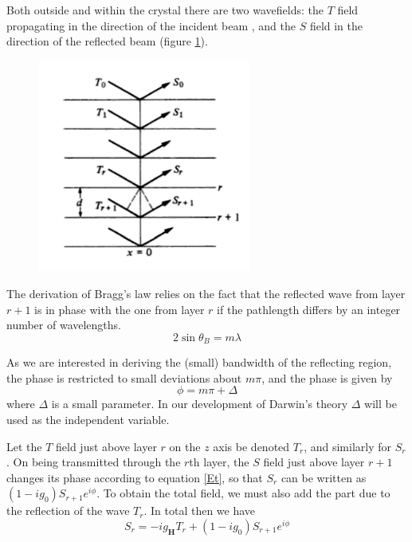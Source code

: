 \documentclass[12pt,oneside,notitlepage,abstracton,a4paper]{scrartcl}
\begin{document}
Both outside and within the crystal there are two wavefields: the $T$ field propagating in the direction of the incident beam , and the $S$ field in the direction of the reflected beam (figure \ref{pic3}).

\begin{figure}[h]
\begin{center}
\includegraphics[width=7cm]{pics/picture3.png}
\caption{}
\label{pic3}
\end{center}
\end{figure}


The derivation of Bragg's law relies on the fact that the reflected wave from layer $r+1$ is in phase with the one from layer $r$ if the pathlength differs by an integer number of wavelengths. 
\begin{equation}\label{bragg}
 2\sin{\theta_B}=m\lambda
\end{equation}

As we are interested in deriving the (small) bandwidth of the reflecting region, the phase is restricted to small deviations about $m\pi$, and the phase is given by
\begin{equation}\label{phase}
 \phi=m\pi+\Delta
\end{equation}
where $\Delta$ is a small parameter. In our development of Darwin's theory $\Delta$ will be used as the independent variable.

Let the $T$ field just above layer $r$ on the $z$ axis be denoted $T_r$, and similarly for $S_r$. On being transmitted through the $r$th layer, the $S$ field just above layer $r+1$ changes its phase according to equation \ref{Et}, so that $S_r$ can be written as $(1-ig_0)S_{r+1}e^{i\phi}$. To obtain the total field, we must also add the part due to the reflection of the wave $T_r$. In total then we have
\begin{equation}\label{eq:TS1}
 S_r=-ig_\mathbf{H}T_r+(1-ig_0)S_{r+1}e^{i\phi}
\end{equation}
\end{document}
